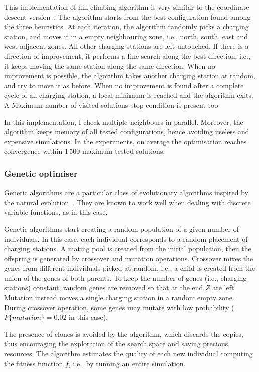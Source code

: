This implementation of hill-climbing algorithm is very similar to the coordinate descent version~\cite{CoordinateDescent}.
The algorithm starts from the best configuration found among the three heuristics. At each iteration, the algorithm randomly picks a charging station, and moves it in a empty neighbouring zone, i.e., north, south, east and west adjacent zones. All other charging stations are left untouched. If there is a direction of improvement, it performs a line search along the best direction, i.e., it keeps moving the same station along the same direction. When no improvement is possible, the algorithm takes another charging station at random, and try to move it as before.
When no improvement is found after a complete cycle of all charging station, a local minimum is reached and the algorithm exits. A Maximum number of visited solutions stop condition is present too.

In this implementation, I check multiple neighbours in parallel. Moreover, the algorithm keeps memory of all tested configurations, hence avoiding useless and expensive simulations. In the experiments, on average the optimisation reaches convergence within 1\,500 maximum tested solutions. 


\subsubsection{Genetic optimiser}

Genetic algorithms are a particular class of evolutionary algorithms inspired by the natural evolution~\cite{GO89}. They are known to work well when dealing with discrete variable functions, as in this case. 

Genetic algorithms start creating a random population of a given number of individuals. In this case, each individual corresponds to a random placement of charging stations. A mating pool is created from the initial population, then the offspring is generated by crossover and mutation operations. Crossover mixes the genes from different individuals picked at random, i.e., a child is created from the union of the genes of both parents. To keep the number of genes (i.e., charging stations) constant, random genes are removed so that at the end $Z$ are left.
Mutation instead moves a single charging station in a random empty zone. During crossover operation, some genes may mutate with low probability ($P\{mutation\}=0.02$ in this case).

The presence of clones is avoided by the algorithm, which discards the copies, thus encouraging the exploration of the search space and saving precious resources. The algorithm estimates the quality of each new individual computing the fitness function $f$, i.e., by running an entire simulation.

